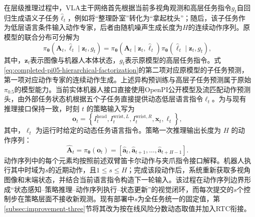 在层级推理过程中，VLA主干网络首先根据当前多视角观测和高层任务指令\(g_t\)自回归生成语义子任务\(\widehat{\ell}_t\)，例如将“整理卧室”转化为“拿起枕头”；随后，该子任务作为低层语言条件输入动作专家，后者由随机噪声生成长度为\(H\)的连续动作序列。原模型的联合分布可分解为
\begin{equation}
  \pi_{\boldsymbol\theta}
  \left(\mathbf A_t,\widehat{\ell}_t\mid\mathbf z_t,g_t\right)
  =
  \pi_{\boldsymbol\theta}
  \left(\mathbf A_t\mid\mathbf z_t,\widehat{\ell}_t\right)
  \pi_{\boldsymbol\theta}
  \left(\widehat{\ell}_t\mid\mathbf z_t,g_t\right),
  \label{eq:completed-pi05-hierarchical-factorization}
\end{equation}
其中，\(\mathbf z_t\)表示图像与机器人本体状态，\(g_t\)表示原模型的高层任务指令。式\eqref{eq:completed-pi05-hierarchical-factorization}的第二项对应原模型的子任务预测，第一项对应动作专家的连续动作生成。上述异构预训练与高层子任务预测属于原始\(\pi_{0.5}\)的模型能力。当前实体机器人接口直接使用OpenPI公开模型及流匹配动作预测头，由外部任务状态机根据五个子任务直接提供动态低层语言指令\(\ell_t\)。为与现有推理接口保持一致，时刻 \(t\) 的策略输入写为
\begin{equation}
  \mathbf o_t
  =
  \left\{
    I^{\mathrm{head}}_t,
    I^{\mathrm{wrist},L}_t,
    I^{\mathrm{wrist},R}_t,
    \mathbf x_t,
    \ell_t
  \right\},
  \label{eq:completed-openpi-observation}
\end{equation}
其中，\(\ell_t\) 为运行时给定的动态任务语言指令。策略一次推理输出长度为 \(H\) 的动作序列：
\begin{equation}
  \widehat{\mathbf A}_t
  =
  \pi_{\boldsymbol\theta}(\mathbf o_t)
  =
  \left[
    \widehat{\mathbf a}_{t},
    \widehat{\mathbf a}_{t+1},
    \ldots,
    \widehat{\mathbf a}_{t+H-1}
  \right].
  \label{eq:completed-openpi-action-chunk}
\end{equation}
动作序列中的每个元素均按照前述双臂笛卡尔动作与夹爪指令接口解释。机器人执行其中时域为\(s\)的近期动作，且\(1\leq s\leq H\)；完成该段动作后，系统重新获取多视角图像和末端状态，并结合当前语言指令构造下一轮输入。该过程在动作序列边界形成“状态感知--策略推理--动作序列执行--状态更新”的视觉闭环，而每次提交的\(s\)个控制步在策略层面不接收新观测。现有部署中\(s\)为全任务统一的固定值，第\ref{subsec:improvement-three}节将其改为按在线风险分数动态取值并加入RTC衔接。

